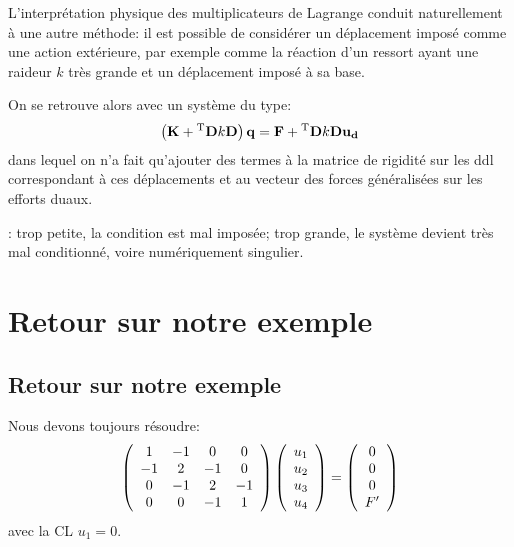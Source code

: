 L'interprétation physique des multiplicateurs de Lagrange conduit naturellement à une autre méthode:
il est possible de considérer un déplacement imposé comme une action extérieure, par exemple comme
la réaction d'un ressort ayant une raideur $k$ très grande et un déplacement imposé à sa base.

\medskip
On se retrouve alors avec un système du type:
\begin{equation}
\left(\mathbf{K} + {}^\mathrm{T}\mathbf{D}k\mathbf{D}\right) \mathbf{q} = \mathbf{F} + {}^\mathrm{T}\mathbf{D}k\mathbf{D}\mathbf{u_d}
\end{equation}
dans lequel on n'a fait qu'ajouter des termes à la matrice de rigidité sur les ddl correspondant à ces
déplacements et au vecteur des forces généralisées sur les efforts duaux.

\medskip
{}: trop petite, la condition est mal imposée; 
trop grande, le système devient très mal conditionné, voire numériquement singulier.





\medskip
\ifVersionAvecExemplesSepares
   \section{Retour sur notre exemple}
\else
   \subsection{Retour sur notre exemple}
\fi

Nous devons toujours résoudre:
\begin{equation}
\left( \begin{array}{cccc} 1 & -1 & 0 & 0 \\ -1 & 2 & -1 & 0 \\ 0 & -1 & 2 & -1\\ 0&0&-1&1
\end{array}\right)
\left(  \begin{array}{c} u_1\\u_2\\u_3\\u_4 \end{array}\right)
=
\left(  \begin{array}{c} 0\\0\\0\\F' \end{array}\right)
\end{equation}
avec la CL $u_1=0$.


